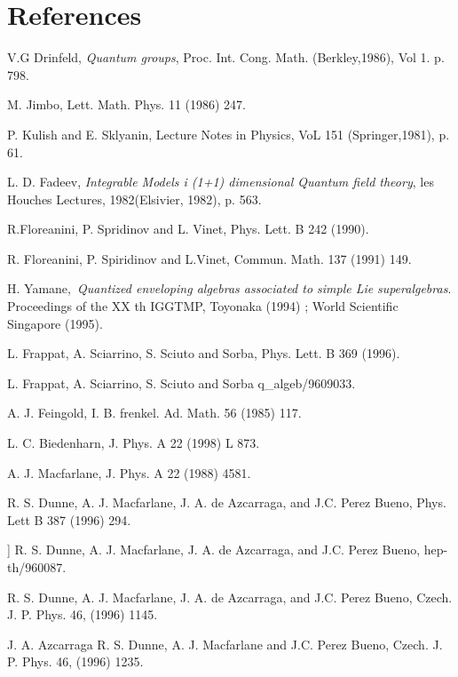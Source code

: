\documentclass[a4paper,12pt,thmsa]{article}
\begin{document}
\section*{References}

\myHighlight{$[1]$}\coordHE{} V.G Drinfeld, \textit{Quantum groups}, Proc. Int. Cong. Math.
(Berkley,1986), Vol 1. p. 798.

\myHighlight{$[2]$}\coordHE{} M. Jimbo, Lett. Math. Phys. 11 (1986) 247.

\myHighlight{$[3]$}\coordHE{} P. Kulish and E. Sklyanin, Lecture Notes in Physics, VoL 151
(Springer,1981), p. 61.

\myHighlight{$[4]$}\coordHE{} L. D. Fadeev, \textit{Integrable Models i (1+1) dimensional Quantum
field theory}, les Houches Lectures, 1982(Elsivier, 1982), p. 563.

\myHighlight{$[5]$}\coordHE{} R.Floreanini, P. Spridinov and L. Vinet, Phys. Lett. B 242 (1990).

\myHighlight{$[6]$}\coordHE{} R. Floreanini, P. Spiridinov and L.Vinet, Commun. Math. 137 (1991) 149.

\myHighlight{$[7]$}\coordHE{} H. Yamane,\textit{\ Quantized enveloping algebras associated to simple
Lie} \textit{superalgebras}. Proceedings of the XX th IGGTMP, Toyonaka
(1994) ; World Scientific Singapore (1995).

\myHighlight{$[8]$}\coordHE{} L. Frappat, A. Sciarrino, S. Sciuto and Sorba, Phys. Lett. B 369
(1996).

\myHighlight{$[9]$}\coordHE{} L. Frappat, A. Sciarrino, S. Sciuto and Sorba\myHighlight{$,$}\coordHE{} q\_algeb/9609033.

\myHighlight{$[10]$}\coordHE{} A. J. Feingold, I. B. frenkel. Ad. Math. 56 (1985) 117.

\myHighlight{$[11]$}\coordHE{} L. C. Biedenharn, J. Phys. A 22 (1998) L 873.

\myHighlight{$[12]$}\coordHE{} A. J. Macfarlane, J. Phys. A 22 (1988) 4581.

\myHighlight{$[13]$}\coordHE{} R. S. Dunne, A. J. Macfarlane, J. A. de Azcarraga, and J.C. Perez
Bueno, Phys. Lett B 387 (1996) 294.

\myHighlight{$[14$}\coordHE{}] R. S. Dunne, A. J. Macfarlane, J. A. de Azcarraga, and J.C. Perez
Bueno, hep-th/960087.

\myHighlight{$[15]$}\coordHE{} R. S. Dunne, A. J. Macfarlane, J. A. de Azcarraga, and J.C. Perez
Bueno, Czech. J. P. Phys. 46, (1996) 1145.

\myHighlight{$[16]$}\coordHE{} J. A. Azcarraga R. S. Dunne, A. J. Macfarlane and J.C. Perez Bueno,
Czech. J. P. Phys. 46, (1996) 1235.
\end{document}

